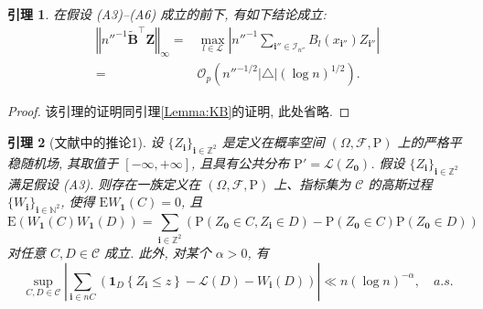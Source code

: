 \documentclass[a4paper,openay,14pt]{ctexbook}
\newtheorem{lem}{引理}
\numberwithin{equation}{section}
\numberwithin{lem}{section}
\begin{document}
\begin{lem}\label{Lemma:BZ}
    在假设 (A3)--(A6) 成立的前下, 有如下结论成立:
    \begin{align*}
       \left\Vert n''^{-1}\tilde{\mathbf{B}}^{\top}\mathbf{Z}\right\Vert_{\infty} =& \max_{l \in \mathcal{L}}\left\vert n''^{-1}\sum_{\mathbf{i}''\in\mathcal{I}_{n''}}B_l(x_{\mathbf{i}''})Z_{\mathbf{i}''}\right\vert \\
        =&\mathcal{O}_p\left(n''^{-1/2}\vert\triangle\vert(\log n)^{1/2}\right).
    \end{align*}
\end{lem}
\begin{proof}
    该引理的证明同引理\ref{Lemma:KB}的证明, 此处省略.
\end{proof}

\begin{lem}[文献\cite{Strittmatter1990}中的推论1] \label{Lemma:Gaussian}
设 $\{Z_{\mathbf{i}}\}_{\mathbf{i}\in\mathbb{Z}^2}$ 是定义在概率空间 $\left(\Omega,\mathcal{F},\mathrm{P}\right)$ 上的严格平稳随机场, 其取值于 $[-\infty,+\infty]$, 且具有公共分布 $\mathrm{P}'=\mathcal{L}\left(Z_{\mathbf{0}}\right)$. 假设 $\{Z_{\mathbf{i}}\}_{\mathbf{i}\in\mathbb{Z}^2}$ 满足假设 (A3). 则存在一族定义在 $\left(\Omega,\mathcal{F},\mathrm{P}\right)$ 上、指标集为 $\mathcal{C}$ 的高斯过程 $\{W_{\mathbf{i}}\}_{\mathbf{i}\in\mathbb{N}^2}$, 使得 $\text{E} W_{\mathbf{1}}(C) = 0$, 且  
$$\mathrm{E}\left(W_{\mathbf{1}}(C)W_{\mathbf{1}}(D)\right) = \sum_{\mathbf{i}\in\mathbb{Z}^2}\left(\mathrm{P}(Z_{\mathbf{0}}\in C,Z_{\mathbf{i}}\in D) - \mathrm{P}(Z_{\mathbf{0}}\in C)\mathrm{P}(Z_{\mathbf{0}}\in D)\right)$$ 
对任意 $C,D\in\mathcal{C}$ 成立. 此外, 对某个 $\alpha>0$, 有
$$\sup_{C,D\in\mathcal{C}}\left\vert \sum_{\mathbf{i}\in nC}\left(\mathbf{1}_D\left\{Z_{\mathbf{i}}\le z\right\} - \mathcal{L}(D) - W_{\mathbf{i}}(D)\right)\right\vert\ll n(\log n)^{-\alpha}, \quad a.s.$$
\end{lem}
\end{document}
